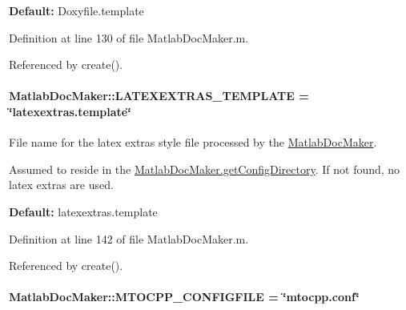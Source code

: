 {\bfseries Default\+:} {\ttfamily Doxyfile.\+template} 

Definition at line 130 of file Matlab\+Doc\+Maker.\+m.



Referenced by create().

\paragraph[{\texorpdfstring{L\+A\+T\+E\+X\+E\+X\+T\+R\+A\+S\+\_\+\+T\+E\+M\+P\+L\+A\+TE}{LATEXEXTRAS\_TEMPLATE}}]{\setlength{\rightskip}{0pt plus 5cm}Matlab\+Doc\+Maker\+::\+L\+A\+T\+E\+X\+E\+X\+T\+R\+A\+S\+\_\+\+T\+E\+M\+P\+L\+A\+TE = \char`\"{}latexextras.\+template\char`\"{}\hspace{0.3cm}{\ttfamily [static]}}\hypertarget{class_matlab_doc_maker_a5fd9647b943b91d54acbfce17d0d7416}{}\label{class_matlab_doc_maker_a5fd9647b943b91d54acbfce17d0d7416}


File name for the latex extras style file processed by the \hyperlink{class_matlab_doc_maker}{Matlab\+Doc\+Maker}. 

Assumed to reside in the \hyperlink{class_matlab_doc_maker_a11a2a8ec616df969a911b325e39b0b4f}{Matlab\+Doc\+Maker.\+get\+Config\+Directory}. If not found, no latex extras are used.

{\bfseries Default\+:} {\ttfamily latexextras.\+template} 

Definition at line 142 of file Matlab\+Doc\+Maker.\+m.



Referenced by create().

\paragraph[{\texorpdfstring{M\+T\+O\+C\+P\+P\+\_\+\+C\+O\+N\+F\+I\+G\+F\+I\+LE}{MTOCPP\_CONFIGFILE}}]{\setlength{\rightskip}{0pt plus 5cm}Matlab\+Doc\+Maker\+::\+M\+T\+O\+C\+P\+P\+\_\+\+C\+O\+N\+F\+I\+G\+F\+I\+LE = \char`\"{}mtocpp.\+conf\char`\"{}\hspace{0.3cm}{\ttfamily [static]}}\hypertarget{class_matlab_doc_maker_ab61ab79ccd92642c4fef74c6abbee559}{}\label{class_matlab_doc_maker_ab61ab79ccd92642c4fef74c6abbee559}



